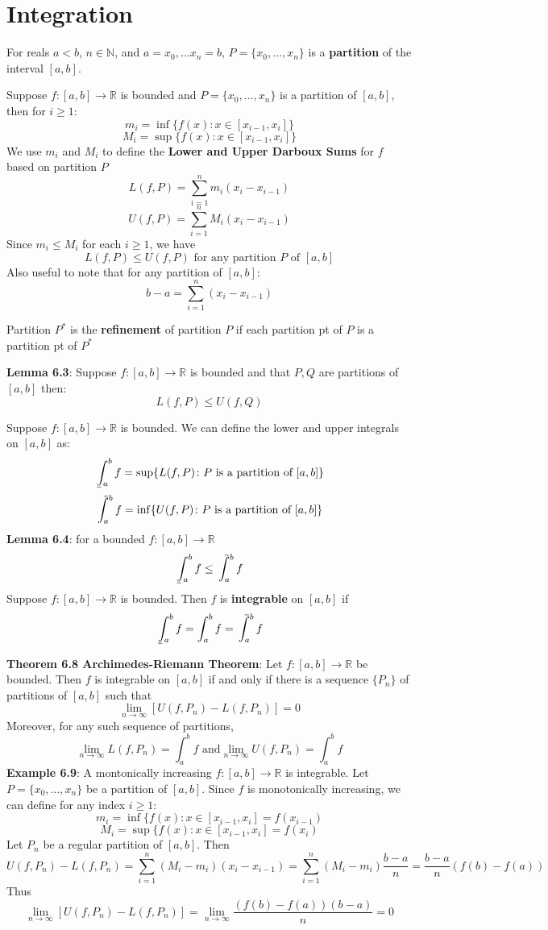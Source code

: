 \documentclass{article}
\def\upint{\mathchoice%
    {\mkern13mu\overline{\vphantom{\intop}\mkern7mu}\mkern-20mu}%
    {\mkern7mu\overline{\vphantom{\intop}\mkern7mu}\mkern-14mu}%
    {\mkern7mu\overline{\vphantom{\intop}\mkern7mu}\mkern-14mu}%
    {\mkern7mu\overline{\vphantom{\intop}\mkern7mu}\mkern-14mu}%
  \int}
\def\lowint{\mkern3mu\underline{\vphantom{\intop}\mkern7mu}\mkern-10mu\int}
\begin{document}
    \section{Integration}
      For reals $a < b$, $n \in \mathbb{N}$, and $a=x_0, \ldots x_{n} = b$, $P = \{x_0, \ldots, x_n\}$ is a \textbf{partition} of the interval $[a, b]$.

      Suppose $f \colon [a, b] \rightarrow \mathbb{R}$ is bounded and $P = \{x_0, \ldots, x_n\}$ is a partition of $[a, b]$, then for $i \geq 1$:
      \[m_i = \inf\{f(x) \colon x \in [x_{i-1}, x_i]\}\]
      \[M_i = \sup\{f(x) \colon x \in [x_{i-1}, x_i]\}\]
      We use $m_i$ and $M_i$ to define the \textbf{Lower and Upper Darboux Sums} for $f$ based on partition $P$
      \[L(f, P) = \sum_{i = 1}^{n}m_i(x_i - x_{i-1})\]
      \[U(f, P) = \sum_{i = 1}^{n}M_i(x_i - x_{i-1})\]
      Since $m_i \leq M_i$ for each $i \geq 1$, we have
      \[L(f, P) \leq U(f, P) \text{ for any partition } P \text{ of } [a,b]\]
      Also useful to note that for any partition of $[a, b]$:
      \[b - a = \sum_{i = 1}^{n}(x_i - x_{i-1})\] \bigskip

      Partition $P^*$ is the \textbf{refinement} of partition $P$ if each partition pt of $P$ is a partition pt of $P^*$

      \textbf{Lemma 6.3}: Suppose $f \colon [a, b] \rightarrow \mathbb{R}$ is bounded and that $P, Q$ are partitions of $[a, b]$ then:
      \[L(f, P) \leq U(f, Q)\] \bigskip

      Suppose $f \colon [a, b] \rightarrow \mathbb{R}$ is bounded. We can define the lower and upper integrals on $[a,b]$ as:
      \[\lowint_{a}^{b}f = \sup\{L(f, P) \colon P \text{ is a partition of } [a,b]\}\]
      \[\upint_{a}^{b}f = \inf\{U(f, P) \colon P \text{ is a partition of } [a,b]\}\]
      \textbf{Lemma 6.4}: for a bounded $f \colon [a, b] \rightarrow \mathbb{R}$
      \[\lowint_{a}^{b}f \leq \upint_{a}^{b}f\]
      Suppose $f \colon [a,b] \rightarrow \mathbb{R}$ is bounded. Then $f$ is \textbf{integrable} on $[a,b]$ if
    \[\lowint_{a}^{b}f = \int_{a}^{b}f = \upint_{a}^{b}f\] \bigskip

    \textbf{Theorem 6.8 Archimedes-Riemann Theorem}: Let $f \colon [a,b] \rightarrow \mathbb{R}$ be bounded. Then $f$ is integrable on $[a, b]$ if and only if there is a sequence $\{P_n\}$ of partitions of $[a,b]$ such that
    \[\lim_{n \rightarrow \infty}[U(f, P_n) - L(f, P_n)] = 0\]
    Moreover, for any such sequence of partitions,
    \[\lim_{n \rightarrow \infty}L(f, P_n) = \int_a^bf \text{ and} \lim_{n \rightarrow \infty}U(f, P_n) = \int_a^bf\]
  \textbf{Example 6.9}: A montonically increasing $f \colon [a, b] \rightarrow \mathbb{R}$ is integrable. Let $P = \{x_0, \ldots, x_n\}$ be a partition of $[a, b]$. Since $f$ is monotonically increasing, we can define for any index $i \geq 1$:
  \[m_i = \inf\{f(x) \colon x \in [x_{i-1}, x_i] = f(x_{i-1})\]
  \[M_i = \sup\{f(x) \colon x \in [x_{i-1}, x_i] = f(x_{i})\]
    Let $P_n$ be a regular partition of $[a,b]$. Then
    \[U(f,P_n) - L(f, P_n) = \sum_{i = 1}^{n}(M_i - m_i)(x_i - x_{i-1}) = \sum_{i = 1}^{n}(M_i - m_i)\frac{b-a}{n} =\frac{b-a}{n}(f(b) - f(a))\]
    Thus
    \[\lim_{n \rightarrow \infty}[U(f, P_n) - L(f, P_n)] = \lim_{n \rightarrow \infty}\frac{(f(b) - f(a))(b-a)}{n} = 0\] \bigskip
\end{document}
